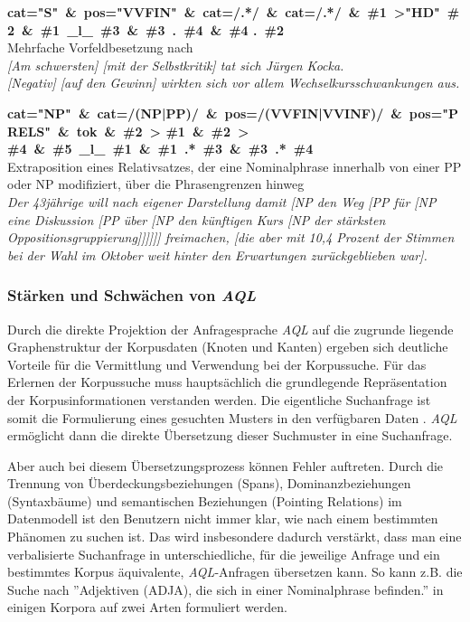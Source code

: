 \begin{description}
	\item{\textbf{cat="{}S"\ \&\ pos="VVFIN"\ \&\ cat=/.*/\ \&\ cat=/.*/\ \&\ \#1\ >"HD"\ \#2\ \&\ \#1\ \_l\_\ \#3\ \&\ \#3\ .\ \#4\ \&\ \#4 .\ \#2}\\ Mehrfache Vorfeldbesetzung nach \cite{muellerXXXXsyntax}\\ 
	\emph{[Am schwersten] [mit der Selbstkritik] tat sich Jürgen Kocka.}\\ 
	\emph{[Negativ] [auf den Gewinn] wirkten sich vor allem Wechselkursschwankungen aus.}
	}
	
	\item{\textbf{cat="NP"\ \&\ cat=/(NP|PP)/\ \&\ pos=/(VVFIN|VVINF)/\ \&\ pos="PRELS"\ \&\ tok\ \&\ \#2\ > \#1\ \&\ \#2\ > \#4\ \&\ \#5\ \_l\_\ \#1\ \&\ \#1\ .*\ \#3\ \&\ \#3\ .*\ \#4}\\ Extraposition eines Relativsatzes, der eine Nominalphrase innerhalb von einer PP oder NP modifiziert, über die Phrasengrenzen hinweg\\
	\emph{Der 43jährige will nach eigener Darstellung damit [NP den Weg [PP für [NP eine Diskussion [PP über [NP den künftigen Kurs [NP der stärksten Oppositionsgruppierung]]]]]] freimachen, [die aber mit 10,4 Prozent der Stimmen bei der Wahl im Oktober weit hinter den Erwartungen zurückgeblieben war].}
	}
\end{description}

\newpage
\subsubsection{Stärken und Schwächen von \emph{AQL}}\label{sec:AQL.Usability}

Durch die direkte Projektion der Anfragesprache \emph{AQL} auf die zugrunde liegende Graphenstruktur der Korpusdaten (Knoten und Kanten) ergeben sich deutliche Vorteile für die Vermittlung und Verwendung bei der Korpussuche. Für das Erlernen der Korpussuche muss hauptsächlich die grundlegende Repräsentation der Korpusinformationen verstanden werden. Die eigentliche Suchanfrage ist somit die Formulierung eines gesuchten Musters in den verfügbaren Daten \citep[vgl.][]{wynneXXXXsearching}. \emph{AQL} ermöglicht dann die direkte Übersetzung dieser Suchmuster in eine Suchanfrage.

Aber auch bei diesem Übersetzungsprozess können Fehler auftreten. Durch die Trennung von Überdeckungsbeziehungen (Spans), Dominanzbeziehungen (Syntaxbäume) und semantischen Beziehungen (Pointing Relations) im Datenmodell ist den Benutzern nicht immer klar, wie nach einem bestimmten Phänomen zu suchen ist. Das wird insbesondere dadurch verstärkt, dass man eine verbalisierte Suchanfrage in unterschiedliche, für die jeweilige Anfrage und ein bestimmtes Korpus äquivalente, \emph{AQL}-Anfragen übersetzen kann. So kann z.B. die Suche nach ''Adjektiven (ADJA), die sich in einer Nominalphrase befinden.'' in einigen Korpora auf zwei Arten formuliert werden. 


